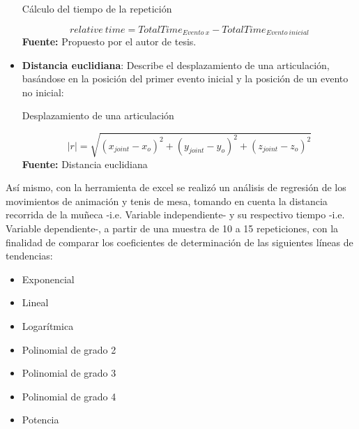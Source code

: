 \begin{itemize}
\begin{formula}[H]
	\centering
	\caption{C\'alculo del tiempo de la repetici\'on}
	\label{frm:relativeTime}
	\begin{equation}
	relative \: time = TotalTime_{Evento\: x}-TotalTime_{Evento\: inicial}
	\end{equation}
		\textbf{Fuente:} Propuesto por el autor de tesis.
\end{formula}
\item \textbf{Distancia euclidiana}: Describe el desplazamiento de una articulaci\'on, bas\'andose en la posici\'on del primer evento inicial y la posici\'on de un evento no inicial:
\begin{formula}[H]
	\centering
	\caption{Desplazamiento de una articulaci\'on}
	\label{frm:desplazaUser}
	\begin{equation}
|r|=\sqrt{(x_{joint}-x_{o})^{2}+(y_{joint}-y_{o})^{2}+(z_{joint}-z_{o})^{2}}
	\end{equation}
	\textbf{Fuente:} Distancia euclidiana \cite[p.~423]{ayres2001calculo}
\end{formula}  
\end{itemize}
As\'i mismo, con la herramienta de excel se realiz\'o un an\'alisis de regresi\'on  de los movimientos de animaci\'on y tenis de mesa, tomando en cuenta  la distancia recorrida de la mu\~neca -i.e. Variable independiente- y su respectivo tiempo -i.e. Variable dependiente-, a partir de una muestra de 10 a 15 repeticiones, con la finalidad de comparar los coeficientes de determinaci\'on de las siguientes l\'ineas de tendencias:
\begin{itemize}
\item Exponencial
\item Lineal
\item Logar\'itmica
\item Polinomial de grado 2
\item Polinomial de grado 3
\item Polinomial de grado 4
\item Potencia
\end{itemize}
